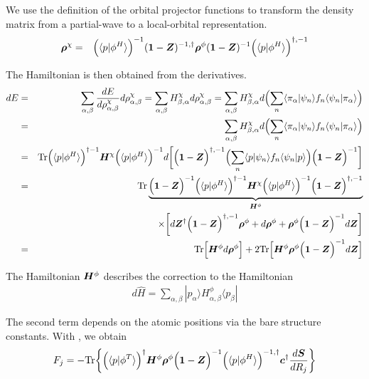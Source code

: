 \documentclass[11pt,a4paper]{report}
\begin{document}
We use the definition of the orbital projector functions
 to transform the density
matrix from a partial-wave to a local-orbital representation.
\begin{eqnarray}
\bm{\rho}^\chi&=&\Bigl(\langle{p}|\phi^H\rangle\Bigr)^{-1}
(\bm{1}-\bm{Z})^{-1,\dagger}
\bm{\rho}^\phi
(\bm{1}-\bm{Z})^{-1}
\Bigl(\langle{p}|\phi^H\rangle\Bigr)^{\dagger,-1}
\end{eqnarray}


The Hamiltonian is then obtained from the derivatives.
\begin{eqnarray}
dE&=&
\sum_{\alpha,\beta}\frac{dE}{d\rho^\chi_{\alpha,\beta}}d\rho^\chi_{\alpha,\beta}
=\sum_{\alpha,\beta} H^\chi_{\beta,\alpha}d\rho^\chi_{\alpha,\beta}
=\sum_{\alpha,\beta} H^\chi_{\beta,\alpha}d
\Bigl(
\sum_n\langle\pi_\alpha|\psi_n\rangle f_n\langle\psi_n|\pi_\alpha\rangle
\Bigr)
\nonumber\\
%
%
&=&\sum_{\alpha,\beta} H^\chi_{\beta,\alpha}d
\Bigl(\sum_n\langle\pi_\alpha|\psi_n\rangle f_n\langle\psi_n|\pi_\alpha\rangle\Bigr)
\nonumber\\
%
%
&=&\Tr
\Bigl(\langle{p}|\phi^H\rangle\Bigr)^{\dagger-1}
\mat{H}^\chi
\Bigl(\langle{p}|\phi^H\rangle\Bigr)^{-1}
d\biggl[
\Bigl(\mat{1}-\mat{Z}\Bigr)^{\dagger,-1}
\Bigl(\sum_n\langle{p}|\psi_n\rangle f_n\langle\psi_n|{p}\rangle\Bigr)
\Bigl(\mat{1}-\mat{Z}\Bigr)^{-1}\biggr]
\nonumber\\
%
%
&=&\Tr
\underbrace{
\Bigl(\mat{1}-\mat{Z}\Bigr)^{-1}
\Bigl(\langle{p}|\phi^H\rangle\Bigr)^{\dagger-1}
\mat{H}^\chi
\Bigl(\langle{p}|\phi^H\rangle\Bigr)^{-1}
\Bigl(\mat{1}-\mat{Z}\Bigr)^{\dagger,-1}}_{\mat{H}^\phi}
\nonumber\\
&&
\times\biggl[
d\mat{Z}^\dagger\Bigl(\mat{1}-\mat{Z}\Bigr)^{\dagger,-1}\mat{\rho}^\phi
+
d\mat{\rho}^\phi
+
\mat{\rho}^\phi \Bigl(\mat{1}-\mat{Z}\Bigr)^{-1}d\mat{Z}
\biggr]
\nonumber\\
%
%
&=&\Tr\Bigl[\mat{H}^\phi d\mat{\rho}^\phi\Bigr]
+2\Tr\Bigl[
\mat{H}^\phi \mat{\rho}^\phi 
\Bigl(\mat{1}-\mat{Z}\Bigr)^{-1}
d\mat{Z}\Bigr]
\end{eqnarray}


The Hamiltonian $\bm{H}^\phi$ describes the correction to the
Hamiltonian
\begin{eqnarray}
d\hat{H}=\sum_{\alpha,\beta} |p_\alpha\rangle H^\phi_{\alpha,\beta}\langle{p}_\beta|
\end{eqnarray}

The second term depends on the atomic positions via the bare structure
constants. With , we obtain
\begin{eqnarray}
F_j=-\mathrm{Tr}\biggl\lbrace
\Bigl(\langle{p}|\phi^T\rangle\Bigr)^{\dagger}
\bm{H}^\phi 
\bm{\rho}^\phi 
\Bigl(\bm{1}-\bm{Z}\Bigr)^{-1}
\Bigl(\langle{p}|\phi^H\rangle\Bigr)^{-1,\dagger}
\bm{c}^\dagger\frac{d\bm{S}}{dR_j}
\biggr\rbrace
\end{eqnarray}
\end{document}
